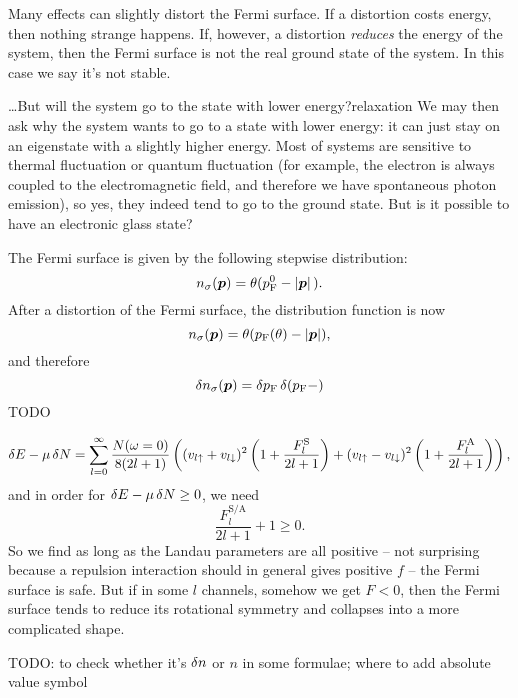\documentclass[hyperref, a4paper]{article}
\newcommand*{\pfermi}{p_{\text{F}}}
\begin{document}
Many effects can slightly distort the Fermi surface.
If a distortion costs energy, 
then nothing strange happens.
If, however, a distortion \emph{reduces} the energy of the system, 
then the Fermi surface is not the real ground state of the system.
In this case we say it's not stable.

\begin{theorybox}{\dots But will the system go to the state with lower energy?}{relaxation}
    We may then ask why the system wants to go to a state with lower energy:
    it can just stay on an eigenstate with a slightly higher energy.
    Most of systems are sensitive to thermal fluctuation 
    or quantum fluctuation 
    (for example, the electron is always coupled to the electromagnetic field, 
    and therefore we have spontaneous photon emission),
    so yes, they indeed tend to go to the ground state.
    But is it possible to have an electronic glass state?
\end{theorybox}

The Fermi surface is given by the following stepwise distribution:
\begin{equation}
    n_\sigma(\vb*{p}) = \theta(\pfermi^0 - \abs*{\vb*{p}}).
\end{equation}
After a distortion of the Fermi surface, 
the distribution function is now 
\begin{equation}
    n_\sigma(\vb*{p}) = \theta (\pfermi(\theta) - \abs{\vb*{p}}),
\end{equation}
and therefore 
\begin{equation}
    \var{n_\sigma(\vb*{p})} = 
    \var{\pfermi} \delta(\pfermi - )
\end{equation}
TODO

\begin{equation}
    \var{E} - \mu \var{N} = 
    \sum_{l=0}^{\infty} \frac{N(\omega = 0)}{8 (2 l + 1)}
    \left(
        (v_{l \uparrow} + v_{l \downarrow})^2 \left(
            1 + \frac{F^{\text{S}}_l}{2 l + 1}
        \right)
        + (v_{l \uparrow} - v_{l \downarrow})^2 \left(
            1 + \frac{F^{\text{A}}_l}{2 l + 1}
        \right)
    \right),
\end{equation}
and in order for $\var{E} - \mu \var{N} \geq 0$, we need 
\begin{equation}
    \frac{F^\text{S/A}_l}{2 l + 1} + 1 \geq 0.
\end{equation}
So we find as long as the Landau parameters are all positive -- 
not surprising because a repulsion interaction should in general gives positive $f$ -- 
the Fermi surface is safe.
But if in some $l$ channels, 
somehow we get $F < 0$,
then the Fermi surface tends to reduce its rotational symmetry
and collapses into a more complicated shape.

TODO: to check whether it's $\var{n}$ or $n$ in some formulae; 
where to add absolute value symbol
\end{document}
